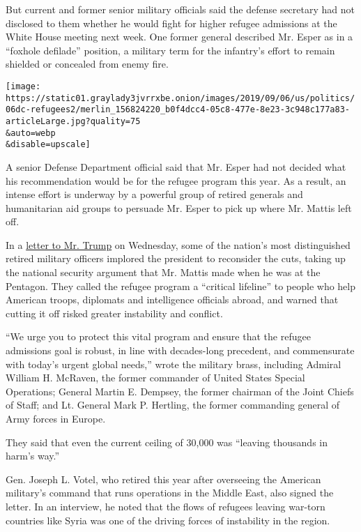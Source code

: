 But current and former senior military officials said the defense
secretary had not disclosed to them whether he would fight for higher
refugee admissions at the White House meeting next week. One former
general described Mr. Esper as in a ``foxhole defilade'' position, a
military term for the infantry's effort to remain shielded or concealed
from enemy fire.

\texttt{[image: https://static01.graylady3jvrrxbe.onion/images/2019/09/06/us/politics/06dc-refugees2/merlin\_156824220\_b0f4dcc4-05c8-477e-8e23-3c948c177a83-articleLarge.jpg?quality=75\\\&auto=webp\\\&disable=upscale]}

A senior Defense Department official said that Mr. Esper had not decided
what his recommendation would be for the refugee program this year. As a
result, an intense effort is underway by a powerful group of retired
generals and humanitarian aid groups to persuade Mr. Esper to pick up
where Mr. Mattis left off.

In a
\href{https://int.graylady3jvrrxbe.onion/data/documenthelper/1694-generals-letter-refugee/46f652adbbef5a13c2c0/optimized/full.pdf\#page=1}{letter
to Mr. Trump} on Wednesday, some of the nation's most distinguished
retired military officers implored the president to reconsider the cuts,
taking up the national security argument that Mr. Mattis made when he
was at the Pentagon. They called the refugee program a ``critical
lifeline'' to people who help American troops, diplomats and
intelligence officials abroad, and warned that cutting it off risked
greater instability and conflict.

``We urge you to protect this vital program and ensure that the refugee
admissions goal is robust, in line with decades-long precedent, and
commensurate with today's urgent global needs,'' wrote the military
brass, including Admiral William H. McRaven, the former commander of
United States Special Operations; General Martin E. Dempsey, the former
chairman of the Joint Chiefs of Staff; and Lt. General Mark P. Hertling,
the former commanding general of Army forces in Europe.

They said that even the current ceiling of 30,000 was ``leaving
thousands in harm's way.''

Gen. Joseph L. Votel, who retired this year after overseeing the
American military's command that runs operations in the Middle East,
also signed the letter. In an interview, he noted that the flows of
refugees leaving war-torn countries like Syria was one of the driving
forces of instability in the region.

